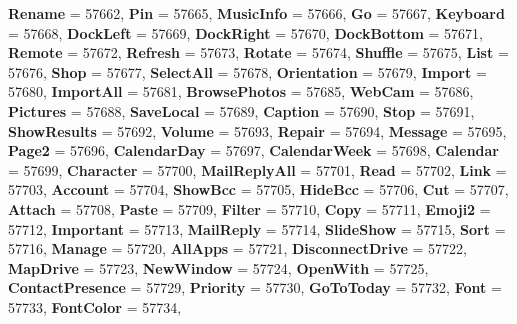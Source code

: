 \begin{DoxyCompactItemize}
{\bfseries Rename} = 57662, 
{\bfseries Pin} = 57665, 
{\bfseries Music\+Info} = 57666, 
{\bfseries Go} = 57667, 
\newline
{\bfseries Keyboard} = 57668, 
{\bfseries Dock\+Left} = 57669, 
{\bfseries Dock\+Right} = 57670, 
{\bfseries Dock\+Bottom} = 57671, 
\newline
{\bfseries Remote} = 57672, 
{\bfseries Refresh} = 57673, 
{\bfseries Rotate} = 57674, 
{\bfseries Shuffle} = 57675, 
\newline
{\bfseries List} = 57676, 
{\bfseries Shop} = 57677, 
{\bfseries Select\+All} = 57678, 
{\bfseries Orientation} = 57679, 
\newline
{\bfseries Import} = 57680, 
{\bfseries Import\+All} = 57681, 
{\bfseries Browse\+Photos} = 57685, 
{\bfseries Web\+Cam} = 57686, 
\newline
{\bfseries Pictures} = 57688, 
{\bfseries Save\+Local} = 57689, 
{\bfseries Caption} = 57690, 
{\bfseries Stop} = 57691, 
\newline
{\bfseries Show\+Results} = 57692, 
{\bfseries Volume} = 57693, 
{\bfseries Repair} = 57694, 
{\bfseries Message} = 57695, 
\newline
{\bfseries Page2} = 57696, 
{\bfseries Calendar\+Day} = 57697, 
{\bfseries Calendar\+Week} = 57698, 
{\bfseries Calendar} = 57699, 
\newline
{\bfseries Character} = 57700, 
{\bfseries Mail\+Reply\+All} = 57701, 
{\bfseries Read} = 57702, 
{\bfseries Link} = 57703, 
\newline
{\bfseries Account} = 57704, 
{\bfseries Show\+Bcc} = 57705, 
{\bfseries Hide\+Bcc} = 57706, 
{\bfseries Cut} = 57707, 
\newline
{\bfseries Attach} = 57708, 
{\bfseries Paste} = 57709, 
{\bfseries Filter} = 57710, 
{\bfseries Copy} = 57711, 
\newline
{\bfseries Emoji2} = 57712, 
{\bfseries Important} = 57713, 
{\bfseries Mail\+Reply} = 57714, 
{\bfseries Slide\+Show} = 57715, 
\newline
{\bfseries Sort} = 57716, 
{\bfseries Manage} = 57720, 
{\bfseries All\+Apps} = 57721, 
{\bfseries Disconnect\+Drive} = 57722, 
\newline
{\bfseries Map\+Drive} = 57723, 
{\bfseries New\+Window} = 57724, 
{\bfseries Open\+With} = 57725, 
{\bfseries Contact\+Presence} = 57729, 
\newline
{\bfseries Priority} = 57730, 
{\bfseries Go\+To\+Today} = 57732, 
{\bfseries Font} = 57733, 
{\bfseries Font\+Color} = 57734, 
\newline

\end{DoxyCompactItemize}

